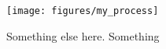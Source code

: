 \begin{minipage}{0.48\textwidth}
  \begin{center}
    \texttt{[image: figures/my\_process]}
  \end{center}
\end{minipage}\hfill
\begin{minipage}{0.48\textwidth}
  \begin{center}
    Something else here. Something
  \end{center}
\end{minipage}



